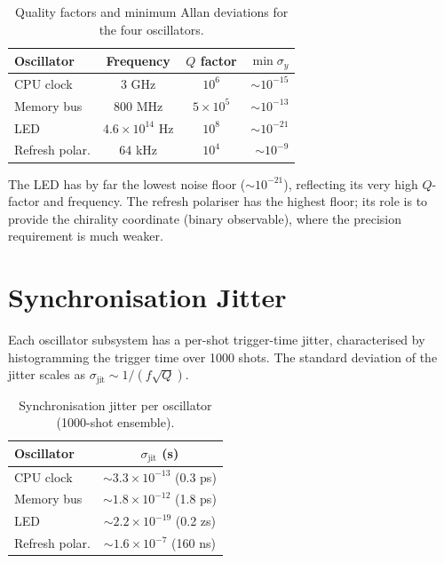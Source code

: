 \documentclass[twocolumn,11pt,a4paper]{article}
\theoremstyle{thmstyle}
\theoremstyle{axiomstyle}
\theoremstyle{definition}
\theoremstyle{remark}
\begin{document}
\begin{table}[H]
\centering
\caption{Quality factors and minimum Allan deviations for the four oscillators.}
\label{tab:allan}
\small
\begin{tabular}{lccr}
\toprule
Oscillator & Frequency & $Q$ factor & $\min \sigma_{y}$\\
\midrule
CPU clock     & $3$ GHz             & $10^{6}$ & $\sim 10^{-15}$\\
Memory bus    & $800$ MHz           & $5\times 10^{5}$ & $\sim 10^{-13}$\\
LED           & $4.6\times 10^{14}$ Hz & $10^{8}$ & $\sim 10^{-21}$\\
Refresh polar.& $64$ kHz             & $10^{4}$ & $\sim 10^{-9}$\\
\bottomrule
\end{tabular}
\end{table}

The LED has by far the lowest noise floor ($\sim 10^{-21}$), reflecting its very high $Q$-factor and frequency. The refresh polariser has the highest floor; its role is to provide the chirality coordinate (binary observable), where the precision requirement is much weaker.



\section{Synchronisation Jitter}
\label{sec:jitter}

Each oscillator subsystem has a per-shot trigger-time jitter, characterised by histogramming the trigger time over 1000 shots. The standard deviation of the jitter scales as $\sigma_{\text{jit}} \sim 1/(f\sqrt{Q})$.

\begin{table}[H]
\centering
\caption{Synchronisation jitter per oscillator (1000-shot ensemble).}
\label{tab:jitter}
\small
\begin{tabular}{lc}
\toprule
Oscillator & $\sigma_{\text{jit}}$ (s)\\
\midrule
CPU clock     & $\sim 3.3\times 10^{-13}$ (0.3 ps)\\
Memory bus    & $\sim 1.8\times 10^{-12}$ (1.8 ps)\\
LED           & $\sim 2.2\times 10^{-19}$ (0.2 zs)\\
Refresh polar.& $\sim 1.6\times 10^{-7}$ (160 ns)\\
\bottomrule
\end{tabular}
\end{table}
\end{document}
